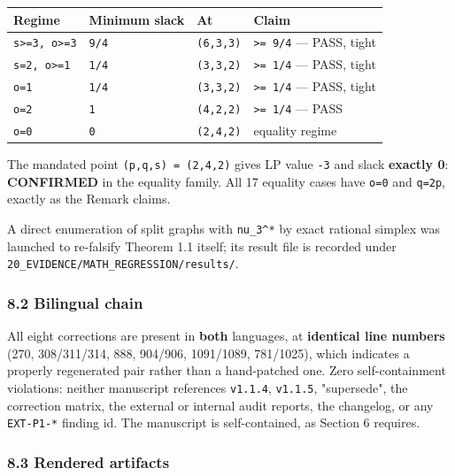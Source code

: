 \documentclass[
  9pt,
  a4paper,
]{article}
\newcounter{none} %
\begin{document}
{\def\LTcaptype{none} %
\begin{longtable}[]{@{}llll@{}}
\toprule\noalign{}
Regime & Minimum slack & At & Claim \\
\midrule\noalign{}
\endhead
\bottomrule\noalign{}
\endlastfoot
\texttt{s\textgreater{}=3,\ o\textgreater{}=3} & \texttt{9/4} &
\texttt{(6,3,3)} & \texttt{\textgreater{}=\ 9/4} --- PASS, tight \\
\texttt{s=2,\ o\textgreater{}=1} & \texttt{1/4} & \texttt{(3,3,2)} &
\texttt{\textgreater{}=\ 1/4} --- PASS, tight \\
\texttt{o=1} & \texttt{1/4} & \texttt{(3,3,2)} &
\texttt{\textgreater{}=\ 1/4} --- PASS, tight \\
\texttt{o=2} & \texttt{1} & \texttt{(4,2,2)} &
\texttt{\textgreater{}=\ 1/4} --- PASS \\
\texttt{o=0} & \texttt{0} & \texttt{(2,4,2)} & equality regime \\
\end{longtable}
}

The mandated point \texttt{(p,q,s)\ =\ (2,4,2)} gives LP value
\texttt{-3} and slack \textbf{exactly 0}: \textbf{CONFIRMED} in the
equality family. All 17 equality cases have \texttt{o=0} and
\texttt{q=2p}, exactly as the Remark claims.

A direct enumeration of split graphs with \texttt{nu\_3\^{}*} by exact
rational simplex was launched to re-falsify Theorem 1.1 itself; its
result file is recorded under
\texttt{20\_EVIDENCE/MATH\_REGRESSION/results/}.

\subsubsection{8.2 Bilingual chain}\label{82-bilingual-chain}

All eight corrections are present in \textbf{both} languages, at
\textbf{identical line numbers} (270, 308/311/314, 888, 904/906,
1091/1089, 781/1025), which indicates a properly regenerated pair rather
than a hand-patched one. Zero self-containment violations: neither
manuscript references \texttt{v1.1.4}, \texttt{v1.1.5}, "supersede", the
correction matrix, the external or internal audit reports, the
changelog, or any \texttt{EXT-P1-*} finding id. The manuscript is
self-contained, as Section 6 requires.

\subsubsection{8.3 Rendered artifacts}\label{83-rendered-artifacts}
\end{document}
